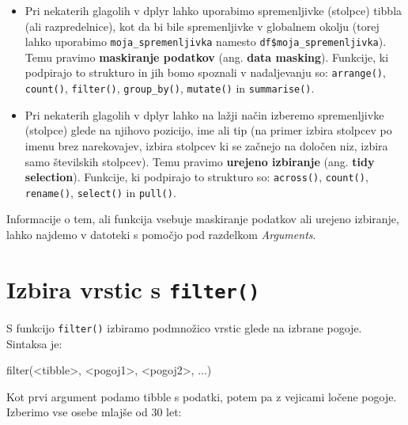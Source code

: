 \documentclass[
]{book}
\newenvironment{Shaded}{\begin{snugshade}}{\end{snugshade}}
\newcommand{\FunctionTok}[1]{\textcolor[rgb]{0.00,0.00,0.00}{#1}}
\newcommand{\NormalTok}[1]{#1}
\newcommand{\SpecialCharTok}[1]{\textcolor[rgb]{0.00,0.00,0.00}{#1}}
\providecommand{\tightlist}{%
  \setlength{\itemsep}{0pt}\setlength{\parskip}{0pt}}
\begin{document}
\begin{itemize}
\tightlist
\item
  Pri nekaterih glagolih v dplyr lahko uporabimo spremenljivke (stolpce) tibbla (ali razpredelnice), kot da bi bile spremenljivke v globalnem okolju (torej lahko uporabimo \texttt{moja\_spremenljivka} namesto \texttt{df\$moja\_spremenljivka}). Temu pravimo \textbf{maskiranje podatkov} (ang. \textbf{data masking}). Funkcije, ki podpirajo to strukturo in jih bomo spoznali v nadaljevanju so: \texttt{arrange()}, \texttt{count()}, \texttt{filter()}, \texttt{group\_by()}, \texttt{mutate()} in \texttt{summarise()}.
\item
  Pri nekaterih glagolih v dplyr lahko na lažji način izberemo spremenljivke (stolpce) glede na njihovo pozicijo, ime ali tip (na primer izbira stolpcev po imenu brez narekovajev, izbira stolpcev ki se začnejo na določen niz, izbira samo številskih stolpcev). Temu pravimo \textbf{urejeno izbiranje} (ang. \textbf{tidy selection}). Funkcije, ki podpirajo to strukturo so: \texttt{across()}, \texttt{count()}, \texttt{rename()}, \texttt{select()} in \texttt{pull()}.
\end{itemize}

Informacije o tem, ali funkcija vsebuje maskiranje podatkov ali urejeno izbiranje, lahko najdemo v datoteki s pomočjo pod razdelkom \emph{Arguments}.

\hypertarget{izbira-vrstic-s-filter}{%
\section{\texorpdfstring{Izbira vrstic s \texttt{filter()}}{Izbira vrstic s filter()}}\label{izbira-vrstic-s-filter}}

S funkcijo \texttt{filter()} izbiramo podmnožico vrstic glede na izbrane pogoje. Sintaksa je:

\begin{Shaded}
\begin{Highlighting}[]
\FunctionTok{filter}\NormalTok{(}\SpecialCharTok{\textless{}}\NormalTok{tibble}\SpecialCharTok{\textgreater{}}\NormalTok{, }\SpecialCharTok{\textless{}}\NormalTok{pogoj1}\SpecialCharTok{\textgreater{}}\NormalTok{, }\SpecialCharTok{\textless{}}\NormalTok{pogoj2}\SpecialCharTok{\textgreater{}}\NormalTok{, ...)}
\end{Highlighting}
\end{Shaded}

Kot prvi argument podamo tibble s podatki, potem pa z vejicami ločene pogoje. Izberimo vse osebe mlajše od 30 let:
\end{document}
